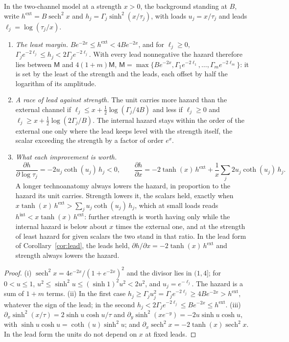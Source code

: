 \begin{proposition}\label{prop:carry}
In the two-channel model at a strength $x>0$, the background standing at
$B$, write $h^{\mathrm{ext}}=B\operatorname{sech}^2x$ and
$h_j=\Gamma_j\sinh^2(x/\tau_j)$, with loads $u_j=x/\tau_j$ and leads
$\ell_j=\log(\tau_j/x)$.
\begin{enumerate}[label=\emph{(\roman*)},itemsep=1pt]
\item \emph{The least margin.} $Be^{-2x}\le h^{\mathrm{ext}}<4Be^{-2x}$,
and for $\ell_j\ge0$,
$\Gamma_je^{-2\ell_j}\le h_j<2\Gamma_je^{-2\ell_j}$. With every lead
nonnegative the hazard therefore lies between $\mathsf M$ and
$4(1+m)\mathsf M$,
$\mathsf M=\max\{Be^{-2x},\Gamma_1e^{-2\ell_1},\dots,\Gamma_me^{-2\ell_m}\}$:
it is set by the least of the strength and the leads, each offset by half
the logarithm of its amplitude.
\item \emph{A race of lead against strength.} The unit carries more
hazard than the external channel if $\ell_j\le x+\tfrac12\log(\Gamma_j/4B)$
and less if $\ell_j\ge0$ and $\ell_j\ge x+\tfrac12\log(2\Gamma_j/B)$. The internal hazard
stays within the order of the external one only where the lead keeps
level with the strength itself, the scalar exceeding the strength by a
factor of order $e^{x}$.
\item \emph{What each improvement is worth.}
\[
\frac{\partial h}{\partial\log\tau_j}=-2u_j\coth(u_j)\,h_j<0,\qquad
\frac{\partial h}{\partial x}=-2\tanh(x)\,h^{\mathrm{ext}}+\frac1x\sum_j2u_j\coth(u_j)\,h_j .
\]
A longer technoanatomy always lowers the hazard, in proportion to the
hazard its unit carries. Strength lowers it, the scalars held, exactly
when $x\tanh(x)\,h^{\mathrm{ext}}>\sum_ju_j\coth(u_j)\,h_j$, which at small
loads reads $h^{\mathrm{int}}<x\tanh(x)\,h^{\mathrm{ext}}$: further strength
is worth having only while the internal hazard is below about $x$ times
the external one, and at the strength of least hazard for given scalars
the two stand in that ratio. In the lead form of
Corollary~\ref{cor:lead}, the leads held,
$\partial h/\partial x=-2\tanh(x)\,h^{\mathrm{ext}}$ and strength always
lowers the hazard.
\end{enumerate}
\end{proposition}

\begin{proof}
(i) $\operatorname{sech}^2x=4e^{-2x}/(1+e^{-2x})^2$ and the divisor lies in
$(1,4]$; for $0<u\le1$, $u^2\le\sinh^2u\le(\sinh1)^2u^2<2u^2$, and
$u_j=e^{-\ell_j}$. The hazard is a sum of $1+m$ terms. (ii) In the first
case $h_j\ge\Gamma_ju_j^2=\Gamma_je^{-2\ell_j}\ge4Be^{-2x}>h^{\mathrm{ext}}$,
whatever the sign of the lead; in the second
$h_j<2\Gamma_je^{-2\ell_j}\le Be^{-2x}\le h^{\mathrm{ext}}$. (iii) $\partial_x\sinh^2(x/\tau)=2\sinh u\cosh u/\tau$
and $\partial_y\sinh^2(xe^{-y})=-2u\sinh u\cosh u$, with
$\sinh u\cosh u=\coth(u)\sinh^2u$; and
$\partial_x\operatorname{sech}^2x=-2\tanh(x)\operatorname{sech}^2x$. In the
lead form the units do not depend on $x$ at fixed leads.
\end{proof}

